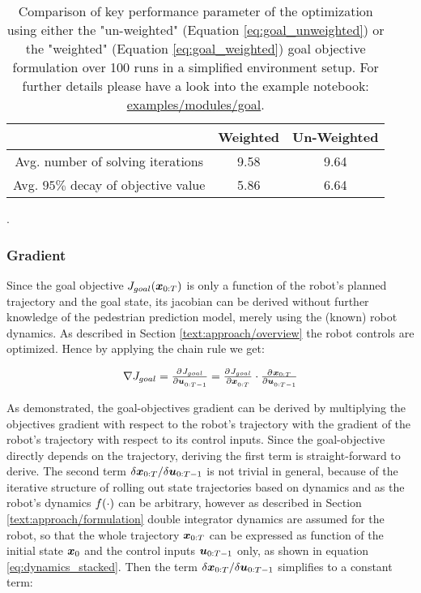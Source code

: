 \begin{table}[!ht]
\begin{center}
\begin{tabular}{c|c|c}
 & Weighted & Un-Weighted \\
\hline
Avg. number of solving iterations & 9.58 & 9.64 \\
\hline
Avg. $95 \%$ decay of objective value & 5.86 & 6.64 \\
\end{tabular}
\caption{Comparison of key performance parameter of the optimization using either the "un-weighted" (Equation \ref{eq:goal_unweighted}) or the "weighted" (Equation  \ref{eq:goal_weighted}) goal objective formulation over 100 runs in a simplified environment setup. For further details please have a look into the example notebook: \href{https://github.com/simon-schaefer/mantrap/blob/master/examples/modules/goal.ipynb}{examples/modules/goal}.}.
\label{table:goal_horizon_weighting}
\end{center}
\end{table}

\subsubsection{Gradient}
Since the goal objective $J_{goal}(\boldsymbol{x}_{0:T})$ is only a function of the robot's planned trajectory and the goal state, its jacobian can be derived without further knowledge of the pedestrian prediction model, merely using the (known) robot dynamics. As described in Section \ref{text:approach/overview} the robot controls are optimized. Hence by applying the chain rule we get: 

\begin{equation}
\nabla J_{goal} = \pd{J_{goal}}{\u_{0:T-1}} = \pd{J_{goal}}{\x_{0:T}} \cdot \pd{\x_{0:T}}{\u_{0:T-1}}
\end{equation}

As demonstrated, the goal-objectives gradient can be derived by multiplying the objectives gradient with respect to the robot's trajectory with the gradient of the robot's trajectory with respect to its control inputs. Since the goal-objective directly depends on the trajectory, deriving the first term is straight-forward to derive. The second term $\delta \boldsymbol{x}_{0:T} / \delta \boldsymbol{u}_{0:T-1}$ is not trivial in general, because of the iterative structure of rolling out state trajectories based on dynamics and as the robot's dynamics $f(\cdot)$ can be arbitrary, however as described in Section \ref{text:approach/formulation} double integrator dynamics are assumed for the robot, so that the whole trajectory $\boldsymbol{x}_{0:T}$ can be expressed as function of the initial state $\boldsymbol{x}_0$ and the control inputs $\boldsymbol{u}_{0:T-1}$ only, as shown in equation \ref{eq:dynamics_stacked}. Then the term $\delta \boldsymbol{x}_{0:T} / \delta \boldsymbol{u}_{0:T-1}$ simplifies to a constant term:


